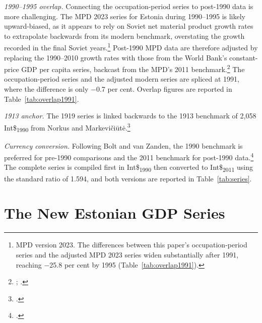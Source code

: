 \documentclass[12pt,a4paper]{article}
\newcommand{\intlnineteen}{Int\$\textsubscript{1990}}   %
\newcommand{\intltwenty}{Int\$\textsubscript{2011}}     %
\begin{document}
\textit{1990--1995 overlap.} Connecting the occupation-period series to post-1990 data is more challenging. The MPD 2023 series for Estonia during 1990--1995 is likely upward-biased, as it appears to rely on Soviet net material product growth rates to extrapolate backwards from its modern benchmark, overstating the growth recorded in the final Soviet years.\footnote{MPD version 2023. The differences between this paper's occupation-period series and the adjusted MPD 2023 series widen substantially after 1991, reaching $-$25.8 per cent by 1995 (Table~\ref{tab:overlap1991}).} Post-1990 MPD data are therefore adjusted by replacing the 1990--2010 growth rates with those from the World Bank's constant-price GDP per capita series, backcast from the MPD's 2011 benchmark.\footnote{\autocite{wdi2024}; \autocite[30]{bolt_zanden_newgdp2021}.} The occupation-period series and the adjusted modern series are spliced at 1991, where the difference is only $-$0.7 per cent. Overlap figures are reported in Table~\ref{tab:overlap1991}.

\textit{1913 anchor.} The 1919 series is linked backwards to the 1913 benchmark of 2,058 \intlnineteen{} from Norkus and Markevi\v{c}i\={u}t\.{e}.\footnote{\autocite[603]{norkusmark2021}.}

\textit{Currency conversion.} Following Bolt and van Zanden, the 1990 benchmark is preferred for pre-1990 comparisons and the 2011 benchmark for post-1990 data.\footnote{\autocite[30]{bolt_zanden_newgdp2021}.} The complete series is compiled first in \intlnineteen{} then converted to \intltwenty{} using the standard ratio of 1.594, and both versions are reported in Table~\ref{tab:series}.

\section{The New Estonian GDP Series}
\label{sec:results}

%
\end{document}
